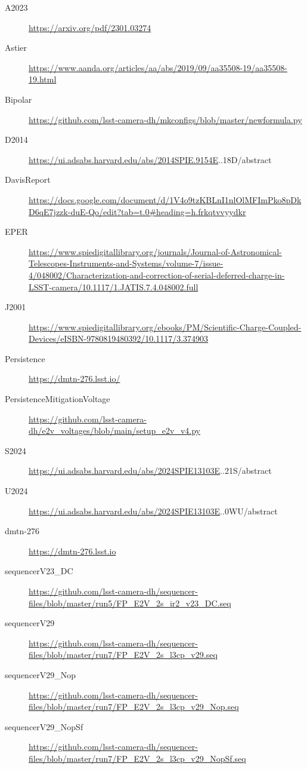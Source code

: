 \begin{description}
\item[\label{A2023}{A2023}]
\url{https://arxiv.org/pdf/2301.03274}
\item[\label{Astier}{Astier}]
\url{https://www.aanda.org/articles/aa/abs/2019/09/aa35508-19/aa35508-19.html}
\item[\label{Bipolar}{Bipolar}]
\url{https://github.com/lsst-camera-dh/mkconfigs/blob/master/newformula.py}
\item[\label{D2014}{D2014}]
\url{https://ui.adsabs.harvard.edu/abs/2014SPIE.9154E}..18D/abstract
\item[\label{DavisReport}{DavisReport}]
\url{https://docs.google.com/document/d/1V4o9tzKBLnI1nlOlMFImPko8pDkD6qE7jzzk-duE-Qo/edit?tab=t.0\#heading=h.frkqtvvyydkr}
\item[\label{EPER}{EPER}]
\url{https://www.spiedigitallibrary.org/journals/Journal-of-Astronomical-Telescopes-Instruments-and-Systems/volume-7/issue-4/048002/Characterization-and-correction-of-serial-deferred-charge-in-LSST-camera/10.1117/1.JATIS.7.4.048002.full}
\item[\label{J2001}{J2001}]
\url{https://www.spiedigitallibrary.org/ebooks/PM/Scientific-Charge-Coupled-Devices/eISBN-9780819480392/10.1117/3.374903}
\item[\label{Persistence}{Persistence}]
\url{https://dmtn-276.lsst.io/}
\item[\label{PersistenceMitigationVoltage}{PersistenceMitigationVoltage}]
\url{https://github.com/lsst-camera-dh/e2v_voltages/blob/main/setup_e2v_v4.py}
\item[\label{S2024}{S2024}]
\url{https://ui.adsabs.harvard.edu/abs/2024SPIE13103E}..21S/abstract
\item[\label{U2024}{U2024}]
\url{https://ui.adsabs.harvard.edu/abs/2024SPIE13103E}..0WU/abstract
\item[\label{dmtn-276}{dmtn-276}]
\url{https://dmtn-276.lsst.io}
\item[\label{sequencerV23_DC}{sequencerV23\_DC}]
\url{https://github.com/lsst-camera-dh/sequencer-files/blob/master/run5/FP_E2V_2s_ir2_v23_DC.seq}
\item[\label{sequencerV29}{sequencerV29}]
\url{https://github.com/lsst-camera-dh/sequencer-files/blob/master/run7/FP_E2V_2s_l3cp_v29.seq}
\item[\label{sequencerV29_Nop}{sequencerV29\_Nop}]
\url{https://github.com/lsst-camera-dh/sequencer-files/blob/master/run7/FP_E2V_2s_l3cp_v29_Nop.seq}
\item[\label{sequencerV29_NopSf}{sequencerV29\_NopSf}]
\url{https://github.com/lsst-camera-dh/sequencer-files/blob/master/run7/FP_E2V_2s_l3cp_v29_NopSf.seq}
\end{description}

